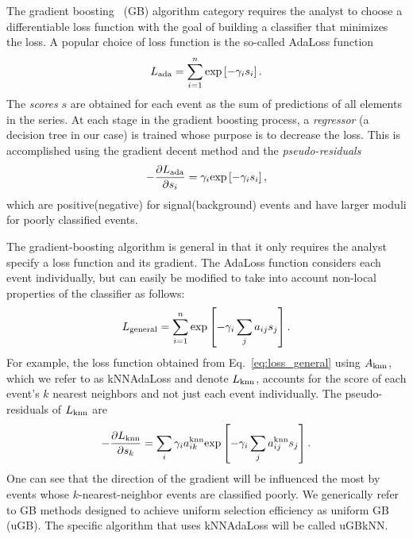 The gradient boosting~\cite{ref:F1999} (GB) algorithm category requires the analyst to choose a differentiable loss function with the goal of building a classifier that minimizes the loss.  
A popular choice of loss function is the so-called AdaLoss function 
\begin{equation}
L_{\rm ada} = \sum\limits_{i=1}^{n} {\rm exp}\left[-\gamma_i s_i\right]. 
\end{equation}
The {\em scores} $s$ are obtained for each event as the sum of predictions of all elements in the series. 
At each stage in the gradient boosting process, a {\em regressor} (a decision tree in our case) is trained whose purpose is to decrease the loss.  This is accomplished using the gradient decent method and the {\em pseudo-residuals}
\begin{equation}
  -\frac{\partial L_{\rm ada}}{\partial s_i} = \gamma_i  {\rm exp}\left[-\gamma_i s_i\right],
\end{equation}
which are positive(negative) for signal(background) events and have larger moduli for poorly classified events.  

The gradient-boosting algorithm is general in that it only requires the analyst specify a loss function and its gradient.  The AdaLoss function considers each event individually, but can easily be modified to take into account non-local properties of the classifier as follows:
\begin{equation}
  \label{eq:loss_general}
  L_{\rm general} = \sum\limits_{i=1}^{n} {\rm exp}\left[-\gamma_i \sum\limits_{j} a_{ij} s_j \right]. 
\end{equation} 
For example, the loss function obtained from Eq.~\ref{eq:loss_general} using $A_{\rm knn}$, which we refer to as kNNAdaLoss and denote $L_{\rm knn}$, accounts for the score of each event's $k$ nearest neighbors and not just each event individually.
The pseudo-residuals of $L_{\rm knn}$ are 
\begin{equation}
  -\frac{\partial L_{\rm knn}}{\partial s_k} = \sum\limits_i \gamma_i a_{ik}^{\rm knn} {\rm exp}\left[-\gamma_i \sum_j a_{ij}^{\rm knn} s_j \right].
\end{equation}
One can see that the direction of the gradient will be influenced the most by events whose $k$-nearest-neighbor events are classified poorly. 
We generically refer to GB methods designed to achieve uniform selection efficiency as uniform GB (uGB).  The specific algorithm that uses kNNAdaLoss will be called uGBkNN.  

